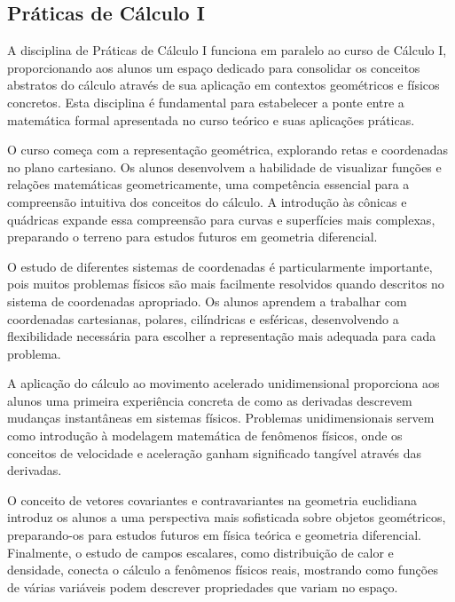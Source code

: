 \documentclass[a4paper, 12pt]{article}
\newcounter{fis}
\newcounter{mat}
\begin{document}
\subsection{Práticas de Cálculo I}
\label{mat002}

A disciplina de Práticas de Cálculo I funciona em paralelo ao curso de Cálculo I,
proporcionando aos alunos um espaço dedicado para consolidar os conceitos abstratos do
cálculo através de sua aplicação em contextos geométricos e físicos concretos. Esta
disciplina é fundamental para estabelecer a ponte entre a matemática formal apresentada
no curso teórico e suas aplicações práticas.

O curso começa com a representação geométrica, explorando retas e coordenadas no plano
cartesiano. Os alunos desenvolvem a habilidade de visualizar funções e relações
matemáticas geometricamente, uma competência essencial para a compreensão intuitiva dos
conceitos do cálculo. A introdução às cônicas e quádricas expande essa compreensão para
curvas e superfícies mais complexas, preparando o terreno para estudos futuros em
geometria diferencial.

O estudo de diferentes sistemas de coordenadas é particularmente importante, pois muitos
problemas físicos são mais facilmente resolvidos quando descritos no sistema de
coordenadas apropriado. Os alunos aprendem a trabalhar com coordenadas cartesianas,
polares, cilíndricas e esféricas, desenvolvendo a flexibilidade necessária para
escolher a representação mais adequada para cada problema.

A aplicação do cálculo ao movimento acelerado unidimensional proporciona aos alunos uma
primeira experiência concreta de como as derivadas descrevem mudanças instantâneas em
sistemas físicos. Problemas unidimensionais servem como introdução à modelagem
matemática de fenômenos físicos, onde os conceitos de velocidade e aceleração ganham
significado tangível através das derivadas.

O conceito de vetores covariantes e contravariantes na geometria euclidiana introduz os
alunos a uma perspectiva mais sofisticada sobre objetos geométricos, preparando-os para
estudos futuros em física teórica e geometria diferencial. Finalmente, o estudo de
campos escalares, como distribuição de calor e densidade, conecta o cálculo a fenômenos
físicos reais, mostrando como funções de várias variáveis podem descrever propriedades
que variam no espaço.
\end{document}
